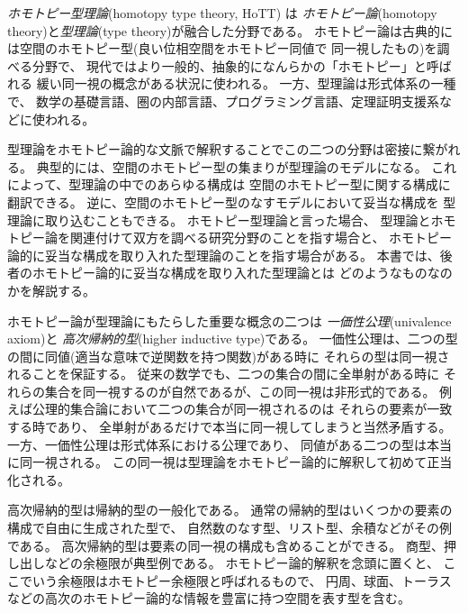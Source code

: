 \documentclass[index]{subfiles}
\begin{document}

\emph{ホモトピー型理論}(homotopy type theory, HoTT) は
\emph{ホモトピー論}(homotopy theory)と\emph{型理論}(type theory)が融合した分野である。
ホモトピー論は古典的には空間のホモトピー型(良い位相空間をホモトピー同値で
同一視したもの)を調べる分野で、
現代ではより一般的、抽象的になんらかの「ホモトピー」と呼ばれる
緩い同一視の概念がある状況に使われる。
一方、型理論は形式体系の一種で、
数学の基礎言語、圏の内部言語、プログラミング言語、定理証明支援系などに使われる。

型理論をホモトピー論的な文脈で解釈することでこの二つの分野は密接に繋がれる。
典型的には、空間のホモトピー型の集まりが型理論のモデルになる。
これによって、型理論の中でのあらゆる構成は
空間のホモトピー型に関する構成に翻訳できる。
逆に、空間のホモトピー型のなすモデルにおいて妥当な構成を
型理論に取り込むこともできる。
ホモトピー型理論と言った場合、
型理論とホモトピー論を関連付けて双方を調べる研究分野のことを指す場合と、
ホモトピー論的に妥当な構成を取り入れた型理論のことを指す場合がある。
本書では、後者のホモトピー論的に妥当な構成を取り入れた型理論とは
どのようなものなのかを解説する。

ホモトピー論が型理論にもたらした重要な概念の二つは
\emph{一価性公理}(univalence axiom)と
\emph{高次帰納的型}(higher inductive type)である。
一価性公理は、二つの型の間に同値(適当な意味で逆関数を持つ関数)がある時に
それらの型は同一視されることを保証する。
従来の数学でも、二つの集合の間に全単射がある時に
それらの集合を同一視するのが自然であるが、この同一視は非形式的である。
例えば公理的集合論において二つの集合が同一視されるのは
それらの要素が一致する時であり、
全単射があるだけで本当に同一視してしまうと当然矛盾する。
一方、一価性公理は形式体系における公理であり、
同値がある二つの型は本当に同一視される。
この同一視は型理論をホモトピー論的に解釈して初めて正当化される。

高次帰納的型は帰納的型の一般化である。
通常の帰納的型はいくつかの要素の構成で自由に生成された型で、
自然数のなす型、リスト型、余積などがその例である。
高次帰納的型は要素の同一視の構成も含めることができる。
商型、押し出しなどの余極限が典型例である。
ホモトピー論的解釈を念頭に置くと、
ここでいう余極限はホモトピー余極限と呼ばれるもので、
円周、球面、トーラスなどの高次のホモトピー論的な情報を豊富に持つ空間を表す型を含む。

\begin{mySubsections}
  
  
  
  
\end{mySubsections}
\end{document}
